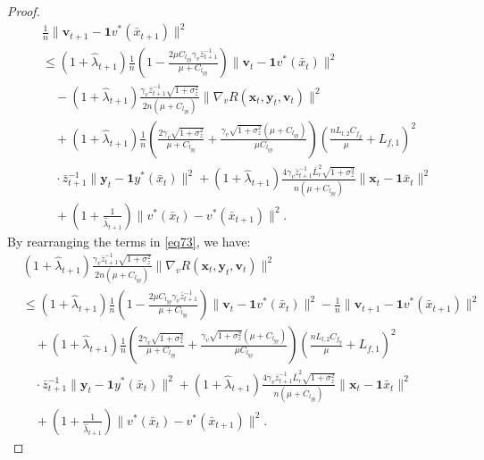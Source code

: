 \documentclass{article}
\theoremstyle{plain}
\theoremstyle{definition}
\theoremstyle{remark}
\begin{document}
\begin{proof}
\begin{align}
  &\frac{1}{n}\|\mathbf{v}_{t+1} - \mathbf{1}v^*(\bar{x}_{t+1})\|^2 \nonumber\\
&\leq (1 + \hat{\lambda}_{t+1}) \frac{1}{n}\left( 1 -  \frac{2\mu C_{l_{yy}}\gamma_v\bar{z}_{t+1}^{-1}}{\mu + C_{l_{yy}}} \right) \|\mathbf{v}_t - \mathbf{1}v^*(\bar{x}_t)\|^2 \nonumber\\
&\quad- (1 + \hat{\lambda}_{t+1})\frac{\gamma_v\bar{z}_{t+1}^{-1}\sqrt{1+\sigma_z^2}}{2n(\mu + C_{l_{yy}}) } \|\nabla_v R(\mathbf{x}_t, \mathbf{y}_t, \mathbf{v}_t)\|^2 \nonumber \\
&\quad + (1 + \hat{\lambda}_{t+1})\frac{1}{n}\left(\frac{2\gamma_v\sqrt{1+\sigma_z^2}}{\mu + C_{l_{yy}}}+\frac{\gamma_v\sqrt{1+\sigma_z^2}(\mu + C_{l_{yy}})}{\mu C_{l_{yy}}} \right)\left(\frac{nL_{l,2}C_{f_y}}{\mu}+L_{f,1}\right)^2\nonumber\\
&\quad\cdot\bar{z}_{t+1}^{-1}\|\mathbf{y}_t - \mathbf{1}y^*(\bar{x}_t)\|^2 +(1 + \hat{\lambda}_{t+1})\frac{4\gamma_v\bar{z}_{t+1}^{-1}\bar{L}_r^2\sqrt{1+\sigma_z^2}}{n(\mu + C_{l_{yy}})}\|\mathbf{x}_t-\mathbf{1}\bar{x}_t\|^2\nonumber\\
&\quad+\left( 1 + \frac{1}{\hat{\lambda}_{t+1}} \right)  \|v^*(\bar{x}_t) - v^*(\bar{x}_{t+1})\|^2.\label{eq73}
\end{align}
By rearranging the terms in \cref{eq73}, we have:
\begin{align}
&(1 + \hat{\lambda}_{t+1})\frac{\gamma_v\bar{z}_{t+1}^{-1}\sqrt{1+\sigma_z^2}}{2n(\mu + C_{l_{yy}}) } \|\nabla_v R(\mathbf{x}_t, \mathbf{y}_t, \mathbf{v}_t)\|^2  \nonumber \\
&\leq (1 + \hat{\lambda}_{t+1}) \frac{1}{n}\left( 1 -  \frac{2\mu C_{l_{yy}}\gamma_v\bar{z}_{t+1}^{-1}}{\mu + C_{l_{yy}}} \right) \|\mathbf{v}_t - \mathbf{1}v^*(\bar{x}_t)\|^2 - \frac{1}{n}\|\mathbf{v}_{t+1} - \mathbf{1}v^*(\bar{x}_{t+1})\|^2 \nonumber \\
&\quad + (1 + \hat{\lambda}_{t+1})\frac{1}{n}\left(\frac{2\gamma_v\sqrt{1+\sigma_z^2}}{\mu + C_{l_{yy}}}+\frac{\gamma_v\sqrt{1+\sigma_z^2}(\mu + C_{l_{yy}})}{\mu C_{l_{yy}}} \right)\left(\frac{nL_{l,2}C_{f_y}}{\mu}+L_{f,1}\right)^2\nonumber\\
&\quad\cdot\bar{z}_{t+1}^{-1}\|\mathbf{y}_t - \mathbf{1}y^*(\bar{x}_t)\|^2+(1 + \hat{\lambda}_{t+1})\frac{4\gamma_v\bar{z}_{t+1}^{-1}\bar{L}_r^2\sqrt{1+\sigma_z^2}}{n(\mu + C_{l_{yy}})}\|\mathbf{x}_t-\mathbf{1}\bar{x}_t\|^2\nonumber \\
&\quad + \left( 1 + \frac{1}{\hat{\lambda}_{t+1}} \right)  \|v^*(\bar{x}_t) - v^*(\bar{x}_{t+1})\|^2.\label{eq74}

\end{align}
\end{proof}
\end{document}
